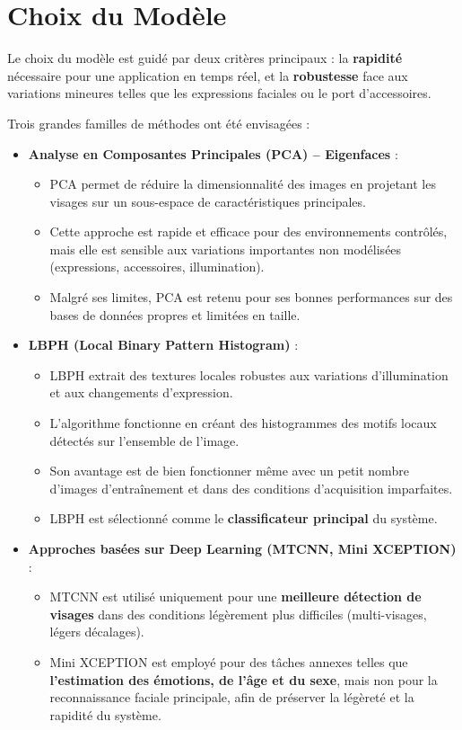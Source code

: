 \documentclass[a4paper,12pt]{report} %
\begin{document}
\section*{Choix du Modèle}
Le choix du modèle est guidé par deux critères principaux : la \textbf{rapidité} nécessaire pour une application en temps réel, et la \textbf{robustesse} face aux variations mineures telles que les expressions faciales ou le port d'accessoires.

Trois grandes familles de méthodes ont été envisagées :

\begin{itemize}
    \item \textbf{Analyse en Composantes Principales (PCA) -- Eigenfaces} : 
    \begin{itemize}
        \item PCA permet de réduire la dimensionnalité des images en projetant les visages sur un sous-espace de caractéristiques principales.
        \item Cette approche est rapide et efficace pour des environnements contrôlés, mais elle est sensible aux variations importantes non modélisées (expressions, accessoires, illumination).
        \item Malgré ses limites, PCA est retenu pour ses bonnes performances sur des bases de données propres et limitées en taille.
    \end{itemize}
    \item \textbf{LBPH (Local Binary Pattern Histogram)} :
    \begin{itemize}
        \item LBPH extrait des textures locales robustes aux variations d'illumination et aux changements d'expression.
        \item L'algorithme fonctionne en créant des histogrammes des motifs locaux détectés sur l'ensemble de l'image.
        \item Son avantage est de bien fonctionner même avec un petit nombre d'images d'entraînement et dans des conditions d'acquisition imparfaites.
        \item LBPH est sélectionné comme le \textbf{classificateur principal} du système.
    \end{itemize}
    \item \textbf{Approches basées sur Deep Learning (MTCNN, Mini XCEPTION)} :
    \begin{itemize}
        \item MTCNN est utilisé uniquement pour une \textbf{meilleure détection de visages} dans des conditions légèrement plus difficiles (multi-visages, légers décalages).
        \item Mini XCEPTION est employé pour des tâches annexes telles que \textbf{l'estimation des émotions, de l'âge et du sexe}, mais non pour la reconnaissance faciale principale, afin de préserver la légèreté et la rapidité du système.
    \end{itemize}
\end{itemize}
\end{document}
